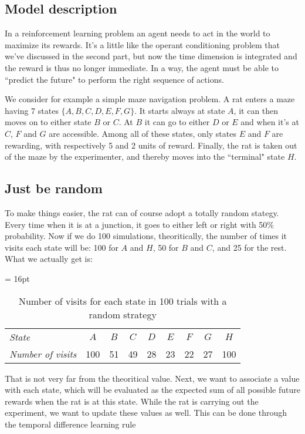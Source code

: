 \subsection{Model description}

In a reinforcement learning problem an agent needs to act in the world to
maximize its rewards. It's a little like the operant conditioning problem that
we've discussed in the second part, but now the time dimension is integrated 
and the reward is thus no longer immediate. In a way, the agent must be able to
``predict the future" to perform the right sequence of actions.

We consider for example a simple maze navigation problem. A rat enters a
maze having 7 states $\{A,B,C,D,E,F,G\}$. It starts always at state $A$, it 
can then moves on to either state $B$ or $C$. At $B$ it can go to either $D$ 
or $E$ and when it's at $C$, $F$ and $G$ are accessible. Among all of these 
states, only states $E$ and $F$ are rewarding, with respectively 5 and 2 
units of reward. Finally, the rat is taken out of the maze by the 
experimenter, and thereby moves into the ``terminal" state $H$.

\subsection{Just be random}

To make things easier, the rat can of course adopt a totally random stategy.
Every time when it is at a junction, it goes to either left or right 
with 50\% probability. Now if we do 100 simulations, theoritically, 
the number of times it visits each state will be: 100 for $A$ and $H$, 50 for 
$B$ and $C$, and 25 for the rest. What we actually get is:

\vspace{0.5em}
\begin{table}[h]
  \tabcolsep = 16pt
  \caption
    {Number of visits for each state in 100 trials with a random strategy}
  \begin{tabular*}{\linewidth}{>{\it}lcccccccc}
    \toprule
    State & $A$ & $B$ & $C$ & $D$ & $E$ & $F$ & $G$ & $H$ \\ 
    Number of visits & 100 & 51 & 49 & 28 & 23 & 22 & 27 & 100 \\
    \bottomrule
  \end{tabular*}
\end{table}

That is not very far from the theoritical value. Next, we want to associate a
value with each state, which will be evaluated as the expected sum of all
possible future rewards when the rat is at this state. While the rat is 
carrying out the experiment, we want to update these values as well. This can 
be done through the temporal difference learning rule

